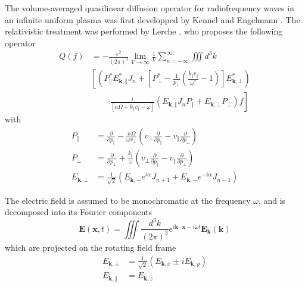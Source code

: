 
\label{rfwave} The volume-averaged quasilinear diffusion operator
for radiofrequency waves in an infinite uniform plasma was first
developped by Kennel and Engelmann \cite{ken66}. The relativistic
treatment was performed by Lerche \cite{ler68}, who proposes the
following operator
\begin{align}
Q\left(  f\right)   &  =-\frac{e^{2}}{\left(  2\pi\right)  ^{3}}%
\lim_{V\rightarrow\infty}\frac{1}{V}\sum_{n=-\infty}^{\infty}\iiint
d^{3}k\label{qloporig}\\
&  \left[  \left(  P_{\Vert}^{\ast}E_{\mathbf{k},\Vert}^{\ast}J_{n}+\left[
P_{\bot}^{\ast}-\frac{1}{p_{\bot}}\left(  \frac{k_{\Vert}v_{\Vert}}%
{\omega^{\ast}}-1\right)  \right]
E_{\mathbf{k},\bot}^{\ast}\right)
\right.\nonumber\\&\qquad\left.\cdot\frac{i}{\left[
n\Omega+k_{\Vert}v_{\Vert}-\omega\right]  }\left(
E_{\mathbf{k},\Vert}J_{n}P_{\Vert}+E_{\mathbf{k},\bot}P_{\bot}\right)
f\right]  \nonumber
\end{align}
with
\begin{align}
P_{\Vert} &  =\frac{\partial}{\partial p_{\Vert}}-\frac{n\Omega}{\omega
v_{\bot}}\left(  v_{\bot}\frac{\partial}{\partial p_{\Vert}}-v_{\Vert}%
\frac{\partial}{\partial p_{\bot}}\right)  \label{ppar}\\
P_{\bot} &  =\frac{\partial}{\partial p_{\bot}}+\frac{k_{\Vert}}{\omega
}\left(  v_{\bot}\frac{\partial}{\partial p_{\Vert}}-v_{\Vert}\frac{\partial
}{\partial p_{\bot}}\right)  \label{pperp}\\
E_{\mathbf{k},\bot} &  =\frac{1}{\sqrt{2}}\left(  E_{\mathbf{k},-}e^{i\alpha
}J_{n+1}+E_{\mathbf{k},+}e^{-i\alpha}J_{n-1}\right)  \label{eperp}%
\end{align}

The electric field is assumed to be monochromatic at the frequency $\omega$,
and is decomposed into its Fourier components
\begin{equation}
\mathbf{E}(\mathbf{x},t)=\iiint\frac{d^{3}k}{(2\pi)^{3}}e^{i\mathbf{k}%
\cdot\mathbf{x}-i\omega t}\mathbf{E}_{\mathbf{k}}\left(  \mathbf{k}\right)
\end{equation}
which are projected on the rotating field frame
\begin{align}
E_{\mathbf{k},\pm}  &  =\frac{1}{\sqrt{2}}\left(  E_{\mathbf{k},x}\pm
iE_{\mathbf{k},y}\right) \label{ekpm}\\
E_{\mathbf{k},\Vert}  &  =E_{\mathbf{k},z}%
\end{align}

